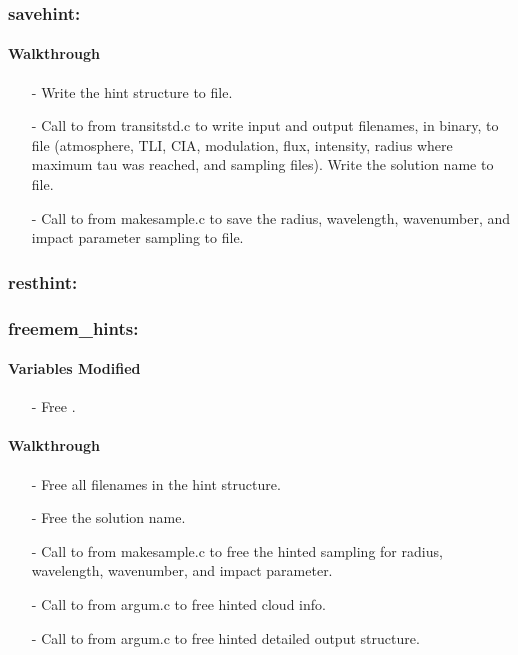 \documentclass[letterpaper,12pt]{article}
\begin{document}
\subsubsection{savehint:}
\paragraph{Walkthrough}
\begin{enumerate}[leftmargin=10pt, noitemsep, parsep=0pt, topsep=0ex]
\item[-] Write the hint structure to file.
\item[-] Call to  from transitstd.c to write input and output filenames, in binary, to file (atmosphere, TLI, CIA, modulation, flux, intensity, radius where maximum tau was reached, and sampling files). Write the solution name to file.
\item[-] Call to  from makesample.c to save the radius, wavelength, wavenumber, and impact parameter sampling to file.
\end{enumerate}

\subsubsection{resthint:}

\subsubsection{freemem\_hints:}
\paragraph{Variables Modified}
\begin{enumerate}[leftmargin=10pt, noitemsep, parsep=0pt, topsep=0ex]
\item[-] Free .
\end{enumerate}

\paragraph{Walkthrough}
\begin{enumerate}[leftmargin=10pt, noitemsep, parsep=0pt, topsep=0ex]
\item[-] Free all filenames in the hint structure.
\item[-] Free the solution name.
\item[-] Call to  from makesample.c to free the hinted sampling for radius, wavelength, wavenumber, and impact parameter.
\item[-] Call to  from argum.c to free hinted cloud info.
\item[-] Call to  from argum.c to free hinted detailed output structure.
\end{enumerate}
\end{document}
